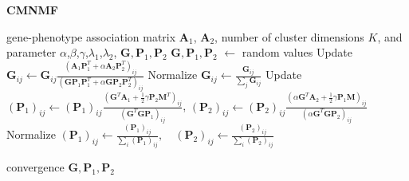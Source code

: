 \documentclass{bmcart}
\begin{document}
\begin{algorithm}[t]
\caption{\textbf{CMNMF}}\label{alg:CMNMF}
\renewcommand{\algorithmicrequire}{\textbf{Input:}}
\renewcommand{\algorithmicensure}{\textbf{Output:}}
\label{alg:pf}
\begin{algorithmic}[1]
\REQUIRE gene-phenotype association matrix $\bm{A}_1$, $\bm{A}_2$, number of cluster dimensions $K$, and parameter $\alpha$,$\beta$,$\gamma$,$\lambda_1$,$\lambda_2$,
\ENSURE {} ${\bm{G}}, {\bm{P}_1}, {\bm{P}_2}$
\STATE ${\bm{G}},{\bm{P}_1},{\bm{P}_2}$ $\leftarrow$ random values
\REPEAT
    \STATE Update $\bm{G}_{ij}\leftarrow \bm{G}_{ij}\frac{(\bm{A}_1\bm{P}_1^T+\alpha \bm{A}_2\bm{P}_2^T)_{ij}}{(\bm{G}\bm{P}_1\bm{P}_1^T+\alpha \bm{G}\bm{P}_2\bm{P}_2^T %
    )_{ij}}    $
    \STATE Normalize $\bm{G}_{ij}\leftarrow \frac{\bm{G}_{ij}}{\sum_{j}\bm{G}_{ij}}$
    \STATE Update $(\bm{P}_1)_{ij}\leftarrow (\bm{P}_1)_{ij}\frac{(\bm{G}^T\bm{A}_1+\frac{1}{2}\gamma \bm{P}_2\bm{M}^T)_{ij}}{(\bm{G}^T\bm{G}\bm{P}_1
    )_{ij}}$,
    $(\bm{P}_2)_{ij}\leftarrow (\bm{P}_2)_{ij}\frac{(\alpha \bm{G}^T\bm{A}_2+\frac{1}{2}\gamma \bm{P}_1\bm{M})_{ij}}
    {(\alpha \bm{G}^T\bm{G}\bm{P}_2
    )_{ij}}$
    \STATE Normalize $(\bm{P}_1)_{ij}\leftarrow \frac{(\bm{P}_1)_{ij}}{\sum_{i}(\bm{P}_1)_{ij}}, \quad
(\bm{P}_2)_{ij}\leftarrow \frac{(\bm{P}_2)_{ij}}{\sum_{i}(\bm{P}_2)_{ij}}$

\UNTIL convergence
\RETURN ${\bm{G}},{\bm{P}_1},{\bm{P}_2}$
\end{algorithmic}
\end{algorithm}
\end{document}
